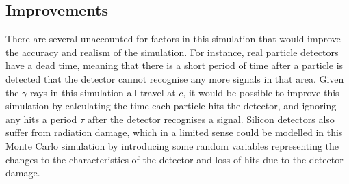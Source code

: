 \subsection{Improvements}
\label{subsec:improvements}

There are several unaccounted for factors in this simulation that would improve the accuracy and realism of the simulation. For instance, real particle detectors have a dead time, meaning that there is a short period of time after a particle is detected that the detector cannot recognise any more signals in that area. Given the $\gamma$-rays in this simulation all travel at $c$, it would be possible to improve this simulation by calculating the time each particle hits the detector, and ignoring any hits a period $\tau$ after the detector recognises a signal. Silicon detectors also suffer from radiation damage, which in a limited sense could be modelled in this Monte Carlo simulation by introducing some random variables representing the changes to the characteristics of the detector and loss of hits due to the detector damage\cite{Moll99}.
